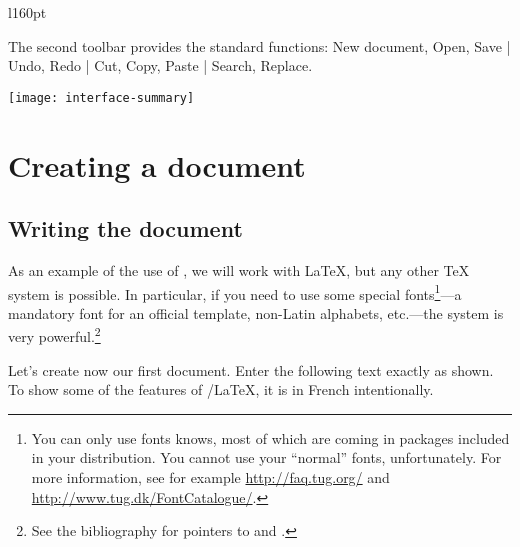 \begin{wrapfigure}[2]{l}{160pt}
\vspace*{-1em}
\usebox{\inlineimg}
\end{wrapfigure}
\noindent The second toolbar provides the standard functions: New document, Open, Save | Undo, Redo | Cut, Copy, Paste | Search, Replace.

\begin{center}
\texttt{[image: interface-summary]}
\end{center}

\section{Creating a document}

\subsection{Writing the document}

As an example of the use of {\Tw}, we will work with \LaTeX{}, but any other {\TeX} system is possible. In particular, if you need to use some special fonts\footnote{You can only use fonts {\AllTeX} knows, most of which are coming in packages included in your distribution. You cannot use your ``normal'' fonts, unfortunately. For more information, see for example \url{http://faq.tug.org/} and \url{http://www.tug.dk/FontCatalogue/}.}---a mandatory font for an official template, non-Latin alphabets, etc.---the {\XeTeX} system is very powerful.\footnote{See the bibliography for pointers to {\XeTeX} and \XeLaTeX.}

Let's create now our first document. Enter the following text exactly as shown. To show some of the features of {\Tw}/{\LaTeX}, it is in French intentionally.


